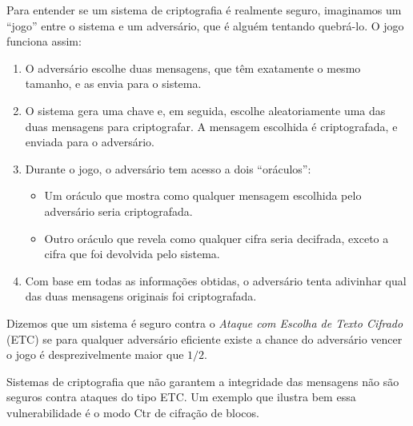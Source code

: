 Para entender se um sistema de criptografia é realmente seguro, imaginamos um ``jogo'' entre o sistema e um adversário, que é alguém tentando quebrá-lo.
O jogo funciona assim:
\begin{enumerate}
\item O adversário escolhe duas mensagens, que têm exatamente o mesmo tamanho, e as envia para o sistema.
\item O sistema gera uma chave e, em seguida, escolhe aleatoriamente uma das duas mensagens para criptografar.
  A mensagem escolhida é criptografada, e enviada para o adversário.
\item Durante o jogo, o adversário tem acesso a dois ``oráculos'':
  \begin{itemize}
  \item Um oráculo que mostra como qualquer mensagem escolhida pelo adversário seria criptografada.
  \item Outro oráculo que revela como qualquer cifra seria decifrada, exceto a cifra que foi devolvida pelo sistema.
  \end{itemize}
\item Com base em todas as informações obtidas, o adversário tenta adivinhar qual das duas mensagens originais foi criptografada.
\end{enumerate}

\begin{center}
\end{center}

Dizemos que um sistema é seguro contra o {\em Ataque com Escolha de Texto Cifrado} (ETC) se para qualquer adversário eficiente existe a chance do adversário vencer o jogo é desprezivelmente maior que $1/2$.

Sistemas de criptografia que não garantem a integridade das mensagens não são seguros contra ataques do tipo ETC.
Um exemplo que ilustra bem essa vulnerabilidade é o modo Ctr de cifração de blocos.

